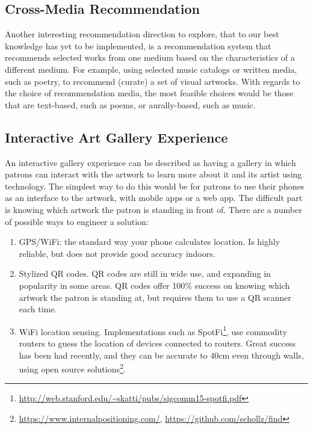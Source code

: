 \documentclass[fontsize=12pt]{scrartcl} %
\begin{document}
\subsection{Cross-Media Recommendation}
Another interesting recommendation direction to explore, that to our best knowledge has yet to be implemented, is a recommendation system that recommends selected works from one medium based on the characteristics of a different medium. For example, using selected music catalogs or written media, such as poetry, to recommend (curate) a set of visual artworks. With regards to the choice of recommendation media, the most feasible choices would be those that are text-based, such as poems, or aurally-based, such as music.

\subsection{Interactive Art Gallery Experience}
An interactive gallery experience can be described as having a gallery in which patrons can interact with the artwork to learn more about it and its artist using technology. The simplest way to do this would be for patrons to use their phones as an interface to the artwork, with mobile apps or a web app. The difficult part is knowing which artwork the patron is standing in front of. There are a number of possible ways to engineer a solution:
\begin{enumerate}
    \item GPS/WiFi: the standard way your phone calculates location. Is highly reliable, but does not provide good accuracy indoors.
    \item Stylized QR codes. QR codes are still in wide use, and expanding in popularity in some areas. QR codes offer 100\% success on knowing which artwork the patron is standing at, but requires them to use a QR scanner each time.
    \item WiFi location sensing. Implementations such as SpotFi\footnote{\url{http://web.stanford.edu/~skatti/pubs/sigcomm15-spotfi.pdf}}, use commodity routers to guess the location of devices connected to routers. Great success has been had recently, and they can be accurate to 40cm even through walls, using open source solutions\footnote{\url{https://www.internalpositioning.com/}, \url{https://github.com/schollz/find}}.
\end{enumerate}
\end{document}
